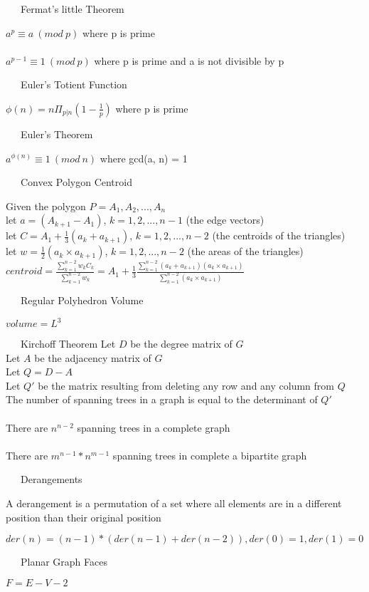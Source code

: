 \documentclass[8pt, oneside]{extarticle}
\begin{document}
\begin{multicols}{3}
~~~Fermat's little Theorem

$a^p \equiv a\ (mod\ p)$ where p is prime\\
\\
$a^{p-1} \equiv 1\ (mod\ p)$ where p is prime and a is not divisible by p

~~~Euler's Totient Function

$\phi(n) = n\Pi_{p|n}(1-\frac{1}{p})$ where p is prime

~~~Euler's Theorem

$a^{\phi(n)} \equiv 1\ (mod\ n)$ where gcd(a, n) = 1

~~~Convex Polygon Centroid

Given the polygon $P = A_1,A_2,...,A_n$\\
let $a = (A_{k+1} - A_1)$, $k = 1,2,...,n-1$ (the edge vectors)\\
let $C = A_1 + \frac{1}{3}(a_k + a_{k+1})$, $k = 1,2,...,n-2$ (the centroids of the triangles)\\
let $w = \frac{1}{2}(a_k{\times}a_{k+1})$, $k = 1,2,...,n-2$ (the areas of the triangles)\\
$centroid = \frac{\sum_{k=1}^{n-2}w_kC_k}{\sum_{k=1}^{n-2}w_k} = A_1 + \frac{1}{3}\frac{\sum_{k=1}^{n-2}(a_k+a_{k+1})(a_k{\times}a_{k+1})}{\sum_{k=1}^{n-2}(a_k{\times}a_{k+1})}$

~~~Regular Polyhedron Volume

$volume = L^3$

~~~Kirchoff Theorem
Let $D$ be the degree matrix of $G$\\
Let $A$ be the adjacency matrix of $G$\\
Let $Q = D - A$\\
Let $Q'$ be the matrix resulting from deleting any row and any column from $Q$\\
The number of spanning trees in a graph is equal to the determinant of $Q'$\\
\\
There are $n^{n-2}$ spanning trees in a complete graph\\
\\
There are $m^{n-1}*n^{m-1}$ spanning trees in complete a bipartite graph

~~~Derangements

A derangement is a permutation of a set where all elements are in a different position than their original position

$der(n) = (n-1)*(der(n-1)+der(n-2)), der(0) = 1, der(1) = 0$

~~~Planar Graph Faces

$F = E - V - 2$
\end{multicols}
\end{document}
